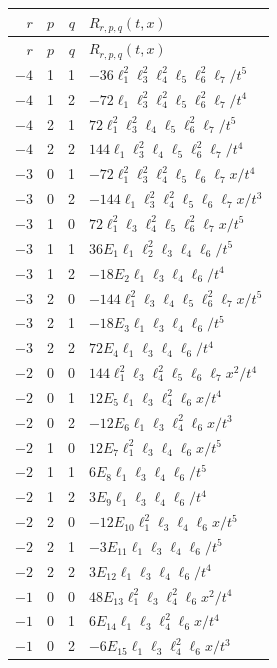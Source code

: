 \documentclass[11pt]{article}
\numberwithin{equation}{section}
\begin{document}
{\small\renewcommand{\arraystretch}{1.7}
\begin{longtable}{@{}rrr l@{}}
\toprule
$r$&$p$&$q$&$R_{r,p,q}(t,x)$\\\midrule
\endfirsthead
\toprule
$r$&$p$&$q$&$R_{r,p,q}(t,x)$\\\midrule
\endhead
$-4$&1&1&$-36\ell_1^2\ell_3^2\ell_4^2\ell_5\ell_6^2\ell_7/t^5$\\
$-4$&1&2&$-72\ell_1\ell_3^2\ell_4^2\ell_5\ell_6^2\ell_7/t^4$\\
$-4$&2&1&$72\ell_1^2\ell_3^2\ell_4\ell_5\ell_6^2\ell_7/t^5$\\
$-4$&2&2&$144\ell_1\ell_3^2\ell_4\ell_5\ell_6^2\ell_7/t^4$\\\addlinespace
$-3$&0&1&$-72\ell_1^2\ell_3^2\ell_4^2\ell_5\ell_6\ell_7x/t^4$\\
$-3$&0&2&$-144\ell_1\ell_3^2\ell_4^2\ell_5\ell_6\ell_7x/t^3$\\
$-3$&1&0&$72\ell_1^2\ell_3\ell_4^2\ell_5\ell_6^2\ell_7x/t^5$\\
$-3$&1&1&$36E_1\ell_1\ell_2^2\ell_3\ell_4\ell_6/t^5$\\
$-3$&1&2&$-18E_2\ell_1\ell_3\ell_4\ell_6/t^4$\\
$-3$&2&0&$-144\ell_1^2\ell_3\ell_4\ell_5\ell_6^2\ell_7x/t^5$\\
$-3$&2&1&$-18E_3\ell_1\ell_3\ell_4\ell_6/t^5$\\
$-3$&2&2&$72E_4\ell_1\ell_3\ell_4\ell_6/t^4$\\\addlinespace
$-2$&0&0&$144\ell_1^2\ell_3\ell_4^2\ell_5\ell_6\ell_7x^2/t^4$\\
$-2$&0&1&$12E_5\ell_1\ell_3\ell_4^2\ell_6x/t^4$\\
$-2$&0&2&$-12E_6\ell_1\ell_3\ell_4^2\ell_6x/t^3$\\
$-2$&1&0&$12E_7\ell_1^2\ell_3\ell_4\ell_6x/t^5$\\
$-2$&1&1&$6E_8\ell_1\ell_3\ell_4\ell_6/t^5$\\
$-2$&1&2&$3E_9\ell_1\ell_3\ell_4\ell_6/t^4$\\
$-2$&2&0&$-12E_{10}\ell_1^2\ell_3\ell_4\ell_6x/t^5$\\
$-2$&2&1&$-3E_{11}\ell_1\ell_3\ell_4\ell_6/t^5$\\
$-2$&2&2&$3E_{12}\ell_1\ell_3\ell_4\ell_6/t^4$\\\addlinespace
$-1$&0&0&$48E_{13}\ell_1^2\ell_3\ell_4^2\ell_6x^2/t^4$\\
$-1$&0&1&$6E_{14}\ell_1\ell_3\ell_4^2\ell_6x/t^4$\\
$-1$&0&2&$-6E_{15}\ell_1\ell_3\ell_4^2\ell_6x/t^3$\\

\end{longtable}}
\end{document}
